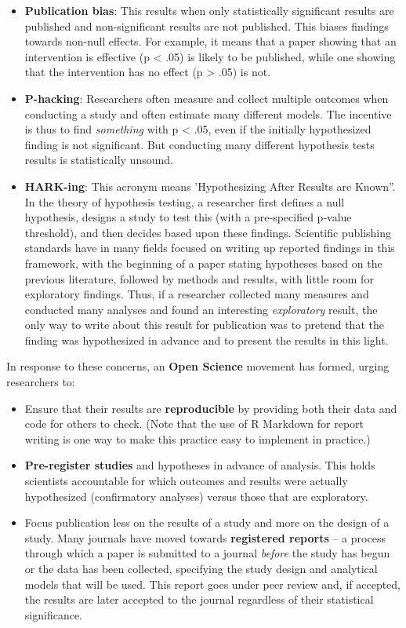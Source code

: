 \documentclass[
  letterpaper,
  DIV=11,
  numbers=noendperiod]{scrreprt}
\providecommand{\tightlist}{%
  \setlength{\itemsep}{0pt}\setlength{\parskip}{0pt}}\usepackage{longtable,booktabs,array}
\theoremstyle{definition}
\theoremstyle{remark}
\begin{document}
\begin{itemize}
\tightlist
\item
  \textbf{Publication bias}: This results when only statistically
  significant results are published and non-significant results are not
  published. This biases findings towards non-null effects. For example,
  it means that a paper showing that an intervention is effective (p
  \textless{} .05) is likely to be published, while one showing that the
  intervention has no effect (p \textgreater{} .05) is not.
\item
  \textbf{P-hacking}: Researchers often measure and collect multiple
  outcomes when conducting a study and often estimate many different
  models. The incentive is thus to find \emph{something} with p
  \textless{} .05, even if the initially hypothesized finding is not
  significant. But conducting many different hypothesis tests results is
  statistically unsound.
\item
  \textbf{HARK-ing}: This acronym means 'Hypothesizing After Results are
  Known''. In the theory of hypothesis testing, a researcher first
  defines a null hypothesis, designs a study to test this (with a
  pre-specified p-value threshold), and then decides based upon these
  findings. Scientific publishing standards have in many fields focused
  on writing up reported findings in this framework, with the beginning
  of a paper stating hypotheses based on the previous literature,
  followed by methods and results, with little room for exploratory
  findings. Thus, if a researcher collected many measures and conducted
  many analyses and found an interesting \emph{exploratory} result, the
  only way to write about this result for publication was to pretend
  that the finding was hypothesized in advance and to present the
  results in this light.
\end{itemize}

In response to these concerns, an \textbf{Open Science} movement has
formed, urging researchers to:

\begin{itemize}
\tightlist
\item
  Ensure that their results are \textbf{reproducible} by providing both
  their data and code for others to check. (Note that the use of R
  Markdown for report writing is one way to make this practice easy to
  implement in practice.)
\item
  \textbf{Pre-register studies} and hypotheses in advance of analysis.
  This holds scientists accountable for which outcomes and results were
  actually hypothesized (confirmatory analyses) versus those that are
  exploratory.
\item
  Focus publication less on the results of a study and more on the
  design of a study. Many journals have moved towards \textbf{registered
  reports} -- a process through which a paper is submitted to a journal
  \emph{before} the study has begun or the data has been collected,
  specifying the study design and analytical models that will be used.
  This report goes under peer review and, if accepted, the results are
  later accepted to the journal regardless of their statistical
  significance.
\end{itemize}
\end{document}
